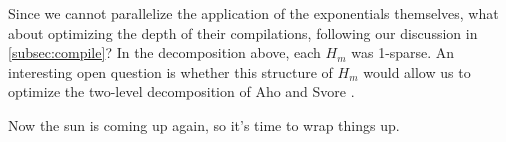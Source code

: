 Since we cannot parallelize the application of the exponentials themselves,
what about optimizing the depth of their compilations, following our
discussion in \ref{subsec:compile}? In the decomposition above, each $H_m$
was 1-sparse. An interesting open question is whether this structure of
$H_m$ would allow us to optimize the two-level decomposition of
Aho and Svore \cite{Aho2003}.

Now the sun is coming up again, so it's time to wrap things up.